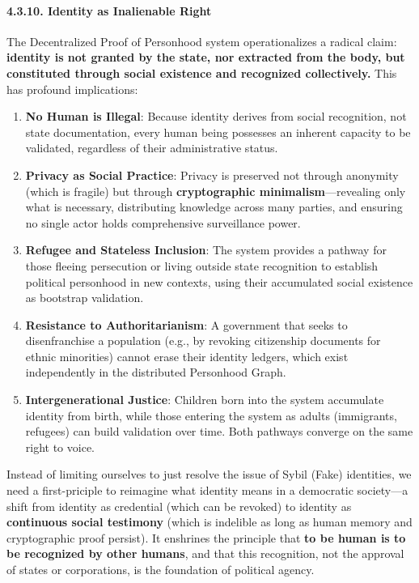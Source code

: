 \paragraph{4.3.10. Identity as Inalienable
Right}\label{identity-as-inalienable-right}

The Decentralized Proof of Personhood system operationalizes a radical
claim: \textbf{identity is not granted by the state, nor extracted from
the body, but constituted through social existence and recognized
collectively.} This has profound implications:

\begin{enumerate}
\def\labelenumi{\arabic{enumi}.}
\item
  \textbf{No Human is Illegal}: Because identity derives from social
  recognition, not state documentation, every human being possesses an
  inherent capacity to be validated, regardless of their administrative
  status.
\item
  \textbf{Privacy as Social Practice}: Privacy is preserved not through
  anonymity (which is fragile) but through \textbf{cryptographic
  minimalism}---revealing only what is necessary, distributing knowledge
  across many parties, and ensuring no single actor holds comprehensive
  surveillance power.
\item
  \textbf{Refugee and Stateless Inclusion}: The system provides a
  pathway for those fleeing persecution or living outside state
  recognition to establish political personhood in new contexts, using
  their accumulated social existence as bootstrap validation.
\item
  \textbf{Resistance to Authoritarianism}: A government that seeks to
  disenfranchise a population (e.g., by revoking citizenship documents
  for ethnic minorities) cannot erase their identity ledgers, which
  exist independently in the distributed Personhood Graph.
\item
  \textbf{Intergenerational Justice}: Children born into the system
  accumulate identity from birth, while those entering the system as
  adults (immigrants, refugees) can build validation over time. Both
  pathways converge on the same right to voice.
\end{enumerate}

Instead of limiting ourselves to just resolve the issue of Sybil (Fake)
identities, we need a first-priciple to reimagine what identity means in
a democratic society---a shift from identity as credential (which can be
revoked) to identity as \textbf{continuous social testimony} (which is
indelible as long as human memory and cryptographic proof persist). It
enshrines the principle that \textbf{to be human is to be recognized by
other humans}, and that this recognition, not the approval of states or
corporations, is the foundation of political agency.

